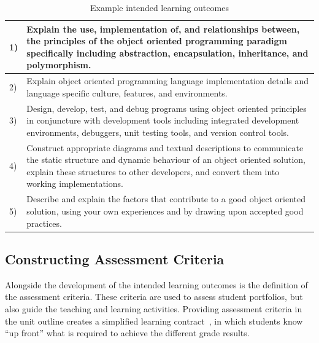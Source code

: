 \begin{table}[!t]
  \footnotesize
\renewcommand{\arraystretch}{1.3}
\caption{Example intended learning outcomes}
\label{tbl:example_intended_learning_outcomes}
\centering
\begin{tabular}{|l p{6.25in}|}
\hline
1) & Explain the use, implementation of, and relationships between, the principles of the object oriented programming paradigm specifically including abstraction, encapsulation, inheritance, and polymorphism.
\\
\hline
2) & Explain object oriented programming language implementation details and language specific culture, features, and environments.
\\
\hline
3) & Design, develop, test, and debug programs using object oriented principles in conjuncture with development tools including integrated development environments, debuggers, unit testing tools, and version control tools. \\
\hline
4) & Construct appropriate diagrams and textual descriptions to communicate the static structure and dynamic behaviour of an object oriented solution, explain these structures to other developers, and convert them into working implementations.\\
\hline
5) & Describe and explain the factors that contribute to a good object oriented solution, using your own experiences and by drawing upon accepted good practices. \\
\hline
\end{tabular}
\end{table}







\subsection{Constructing Assessment Criteria} %
\label{sub:constructing_assessment_criteria}

Alongside the development of the intended learning outcomes is the definition of the assessment criteria. These criteria are used to assess student portfolios, but also guide the teaching and learning activities. Providing assessment criteria in the unit outline creates a simplified learning contract~\cite{Stephenson:1993}, in which students know ``up front'' what is required to achieve the different grade results.

